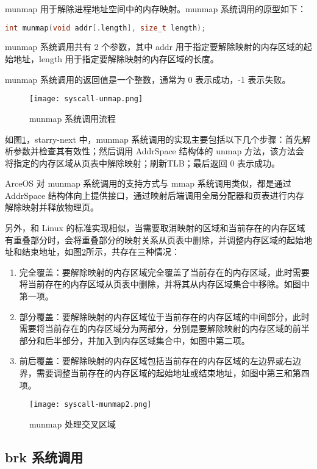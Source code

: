 munmap 用于解除进程地址空间中的内存映射。munmap 系统调用的原型如下：
\begin{lstlisting}[language=c, caption=munmap]
int munmap(void addr[.length], size_t length);
\end{lstlisting}
munmap 系统调用共有 2 个参数，其中 addr 用于指定要解除映射的内存区域的起始地址，length 用于指定要解除映射的内存区域的长度。

munmap 系统调用的返回值是一个整数，通常为 0 表示成功，-1 表示失败。

\begin{figure}[H]
    \centering
    \texttt{[image: syscall-unmap.png]}
    \caption{munmap 系统调用流程}
    \label{fig:munmap}
\end{figure}

如图\ref{fig:munmap}，starry-next 中，munmap 系统调用的实现主要包括以下几个步骤：首先解析参数并检查其有效性；然后调用 AddrSpace 结构体的 unmap 方法，该方法会将指定的内存区域从页表中解除映射；刷新TLB；最后返回 0 表示成功。

ArceOS 对 munmap 系统调用的支持方式与 mmap 系统调用类似，都是通过 AddrSpace 结构体向上提供接口，通过映射后端调用全局分配器和页表进行内存解除映射并释放物理页。 

另外，和 Linux 的标准实现相似，当需要取消映射的区域和当前存在的内存区域有重叠部分时，会将重叠部分的映射关系从页表中删除，并调整内存区域的起始地址和结束地址，如图\ref{fig:munmap2}所示，共存在三种情况：
\begin{enumerate}
    \item 完全覆盖：要解除映射的内存区域完全覆盖了当前存在的内存区域，此时需要将当前存在的内存区域从页表中删除，并将其从内存区域集合中移除。如图中第一项。
    \item 部分覆盖：要解除映射的内存区域位于当前存在的内存区域的中间部分，此时需要将当前存在的内存区域分为两部分，分别是要解除映射的内存区域的前半部分和后半部分，并加入到内存区域集合中，如图中第二项。
    \item 前后覆盖：要解除映射的内存区域包括当前存在的内存区域的左边界或右边界，需要调整当前存在的内存区域的起始地址或结束地址，如图中第三和第四项。
\end{enumerate}

\begin{figure}[H]
    \centering
    \texttt{[image: syscall-munmap2.png]}
    \caption{munmap 处理交叉区域}
    \label{fig:munmap2}
\end{figure}


\subsection{brk 系统调用}

